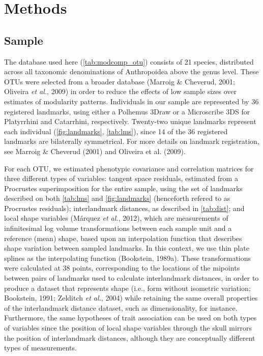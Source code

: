 \documentclass[11pt,twoside]{report}
\begin{document}
\section{Methods}\label{methods}

\subsection{Sample}\label{sample}

The database used here (\autoref{tab:modcomp_otu}) consists of 21
species, distributed across all taxonomic denominations of Anthropoidea
above the genus level. These OTUs were selected from a broader database
(Marroig \& Cheverud, 2001; Oliveira \emph{et al.}, 2009) in order to
reduce the effects of low sample sizes over estimates of modularity
patterns. Individuals in our sample are represented by 36 registered
landmarks, using either a Polhemus 3Draw or a Microscribe 3DS for
Platyrrhini and Catarrhini, respectively. Twenty-two unique landmarks
represent each individual (\autoref{fig:landmarks}, \autoref{tab:lms}),
since 14 of the 36 registered landmarks are bilaterally symmetrical. For
more details on landmark registration, see Marroig \& Cheverud (2001)
and Oliveira et al. (2009).



For each OTU, we estimated phenotypic covariance and correlation
matrices for three different types of variables: tangent space
residuals, estimated from a Procrustes superimposition for the entire
sample, using the set of landmarks described on both \autoref{tab:lms}
and \autoref{fig:landmarks} (henceforth refered to as Procrustes
residuals); interlandmark distances, as described in \autoref{tab:dist};
and local shape variables (Márquez \emph{et al.}, 2012), which are
measurements of infinitesimal log volume transformations between each
sample unit and a reference (mean) shape, based upon an interpolation
function that describes shape variation between sampled landmarks. In
this context, we use thin plate splines as the interpolating function
(Bookstein, 1989a). These transformations were calculated at 38 points,
corresponding to the locations of the mipoints between pairs of
landmarks used to calculate interlandmark distances, in order to produce
a dataset that represents shape (i.e., form without isometric variation;
Bookstein, 1991; Zelditch \emph{et al.}, 2004) while retaining the same
overall properties of the interlandmark distance dataset, such as
dimensionality, for instance. Furthermore, the same hypotheses of trait
association can be used on both types of variables since the position of
local shape variables through the skull mirrors the position of
interlandmark distances, although they are conceptually different types
of measurements.
\end{document}
